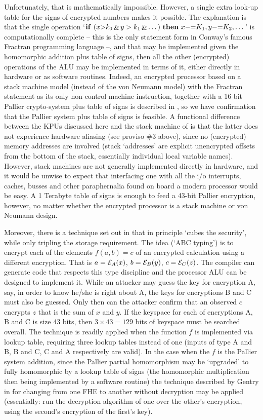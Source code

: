 \documentclass[conference]{IEEEtran}
\def\E{{\cal{E}}}
\begin{document}
Unfortunately, that is mathematically impossible.  However, a single
extra look-up table for the signs of encrypted numbers makes it
possible.  The explanation is that the single operation `${\bf
if}~(x{>}k_0 \mathop{\&} y>k_1 \mathop{\&} \dots)~{\bf
then}~x{{-}{=}}K_1,y{{-}{=} }K_2,\dots$' is computationally complete --
this is the only statement form in Conway's famous Fractran programming
language \cite{conway87fractran} --, and that may be implemented given the
homomorphic addition plus table of signs, then all the other 
(encrypted) operations of the ALU may be implemented in terms of it,
either directly in hardware or as software routines.  Indeed, an
encrypted processor based on a stack machine model (instead of the von
Neumann model) with the Fractran statement as its only non-control
machine instruction, together with a 16-bit Pallier crypto-system plus
table of signs is described in \cite{heroic}, so we have confirmation
that the Pallier system plus table of signs is feasible.  A
functional difference between the KPUs discussed here and the stack
machine of \cite{heroic} is that the latter does not experience hardware
aliasing (see proviso \#3 above), since no (encrypted) memory addresses
are involved (stack `addresses' are explicit unencrypted offsets from
the bottom of the stack, essentially individual local variable names).
However, stack machines are not generally implemented directly in
hardware, and it would be unwise to expect that interfacing one with
all the i/o interrupts, caches, busses and other paraphernalia found on
board a modern processor would be easy.  A 1 Terabyte table of signs is
enough to feed a 43-bit Pallier encryption, however, no matter whether
the encrypted processor is a stack machine or von Neumann
design.

Moreover, there is a technique set out in \cite{BB14b} that in principle
`cubes the security', while only tripling the storage requirement.  The
idea (`ABC typing') is to encrypt each of the elements $f(a,b)=c$ of an
encrypted calculation using a different encryption.  That is
$a=\E_A(x)$, $b=\E_B(y)$, $c=\E_C(z)$.  The compiler can generate code
that respects this type discipline and the processor ALU can be designed
to implement it.  While an attacker may guess the key for encryption A,
say, in order to know he/she is right about A, the keys for encryptions
B and C must also be guessed.  Only then can the attacker confirm that
an observed $c$ encrypts $z$ that is the sum of $x$ and $y$.  If the
keyspace for each of encryptions A, B and C is size 43 bits, then
$3\times43=129$ bits of keyspace must be searched overall.  The
technique is readily applied when the function $f$ is implemented via
lookup table, requiring three lookup tables instead of one (inputs of
type A and B, B and C, C and A respectively are valid).  In the case
when the $f$ is the Pallier system addition, since the Pallier partial
homomorphism may be `upgraded' to fully homomorphic by a lookup table of
signs (the homomorphic multiplication then being implemented by a
software routine) the technique described by Gentry in \cite{Gentry09}
for changing from one FHE to another without decryption may be applied
(essentially: run the decryption algorithm of one over the other's
encryption, using the second's encryption of the first's key).
\end{document}
